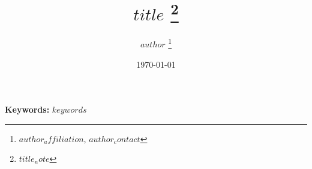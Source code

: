 \begin{titlepage}
\title{
    $title$
    \thanks{$title_note$}
    }
\author{
    $author$ \thanks{$author_affiliation$, $author_contact$}
    } 
\date{\today}

\maketitle



\noindent\textbf{Keywords:} $keywords$ 


\setcounter{page}{0}
\thispagestyle{empty}
\end{titlepage}

